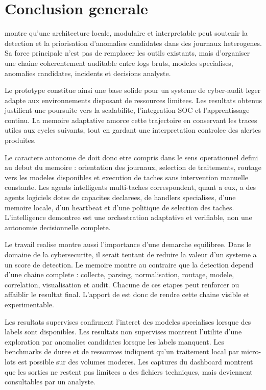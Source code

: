 \section{Conclusion generale}
\logminer{} montre qu'une architecture locale, modulaire et interpretable peut soutenir la detection et la priorisation d'anomalies candidates dans des journaux heterogenes. Sa force principale n'est pas de remplacer les outils existants, mais d'organiser une chaine coherentement auditable entre logs bruts, modeles specialises, anomalies candidates, incidents et decisions analyste.

Le prototype constitue ainsi une base solide pour un systeme de cyber-audit leger adapte aux environnements disposant de ressources limitees. Les resultats obtenus justifient une poursuite vers la scalabilite, l'integration SOC et l'apprentissage continu. La memoire adaptative amorce cette trajectoire en conservant les traces utiles aux cycles suivants, tout en gardant une interpretation controlee des alertes produites.

Le caractere autonome de \logminer{} doit donc etre compris dans le sens operationnel defini au debut du memoire : orientation des journaux, selection de traitements, routage vers les modeles disponibles et execution de taches sans intervention manuelle constante. Les agents intelligents multi-taches correspondent, quant a eux, a des agents logiciels dotes de capacites declarees, de handlers specialises, d'une memoire locale, d'un heartbeat et d'une politique de selection des taches. L'intelligence demontree est une orchestration adaptative et verifiable, non une autonomie decisionnelle complete.

Le travail realise montre aussi l'importance d'une demarche equilibree. Dans le domaine de la cybersecurite, il serait tentant de reduire la valeur d'un systeme a un score de detection. Le memoire montre au contraire que la detection depend d'une chaine complete : collecte, parsing, normalisation, routage, modele, correlation, visualisation et audit. Chacune de ces etapes peut renforcer ou affaiblir le resultat final. L'apport de \logminer{} est donc de rendre cette chaine visible et experimentable.

Les resultats supervises confirment l'interet des modeles specialises lorsque des labels sont disponibles. Les resultats non supervises montrent l'utilite d'une exploration par anomalies candidates lorsque les labels manquent. Les benchmarks de duree et de ressources indiquent qu'un traitement local par micro-lots est possible sur des volumes moderes. Les captures du dashboard montrent que les sorties ne restent pas limitees a des fichiers techniques, mais deviennent consultables par un analyste.

